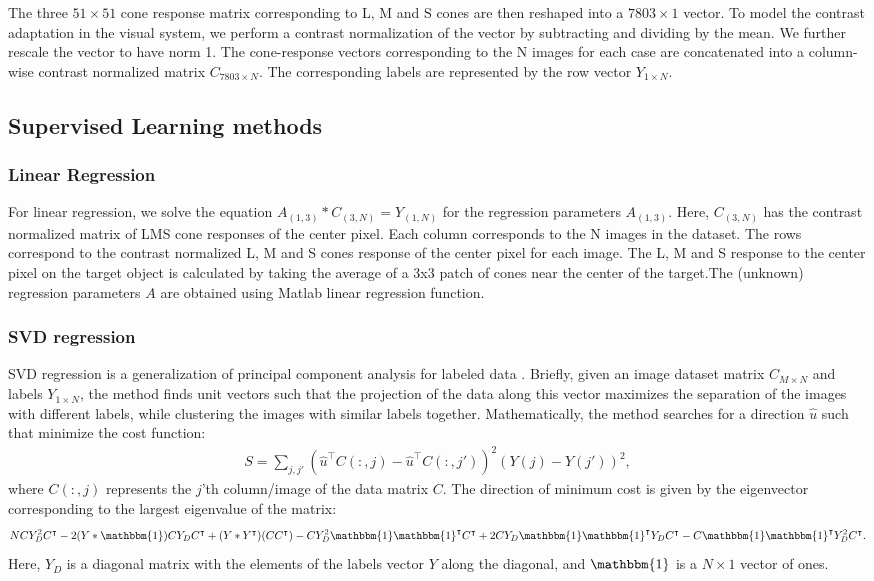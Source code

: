 \documentclass{jov}
\begin{document}
The three $51 \times 51$ cone response matrix corresponding to L, M and S cones are then reshaped into a $7803 \times 1$ vector. To model the contrast adaptation in the visual system, we perform a contrast normalization of the vector by subtracting and dividing by the mean. We further  rescale the vector to have norm 1. The cone-response vectors corresponding to the N images for each case are concatenated into a column-wise contrast normalized matrix $C_{7803\times N}$. The corresponding labels are represented by the row vector $Y_{1\times N}$.

\subsection{Supervised Learning methods} \label{method:SupervisedLearning}
\subsubsection*{Linear Regression} For linear regression, we solve the equation $A_{(1,3)}*C_{(3,N)} = Y_{(1,N)}$ for the regression parameters $A_{(1,3)}$. Here, $C_{(3,N)}$ has the contrast normalized matrix of LMS cone responses of the center pixel. Each column corresponds to the N images in the dataset. The rows correspond to the contrast normalized L, M and S cones response of the center pixel for each image. The L, M and S response to the center pixel on the target object is calculated by taking the average of a 3x3 patch of cones near the center of the target.The (unknown) regression parameters $A$ are obtained using Matlab linear regression function. 

\subsubsection*{SVD regression}
SVD regression is a generalization of principal component analysis for labeled data \cite{ranganNotes}. Briefly, given an image dataset matrix $C_{M \times N}$ and labels $Y_{1\times N}$, the method finds unit vectors such that the projection of the data along this vector maximizes the separation of the images with different labels, while clustering the images with similar labels together. Mathematically, the method searches for a direction $\hat{u}$ such that minimize the cost function:
\begin{align}
S = \sum\limits_{j,j'}\left(\hat{u}^\intercal C(:,j) - \hat{u}^\intercal C(:,j')\right)^2 \left(Y(j)-Y(j') \right)^2,
\end{align} 
where $C(:,j)$ represents the $j$'th column/image of the data matrix $C$. The direction of minimum cost is given by the eigenvector corresponding to the largest eigenvalue of the matrix:
\begin{align}
N C Y_D^2 C^\intercal - 2(Y*\mathbbm{1})C Y_D C^\intercal + (Y*Y^\intercal) (CC^\intercal)-C Y_{D}^2\mathbbm{1}\mathbbm{1}^\intercal C^\intercal +2 C Y_{D} \mathbbm{1}\mathbbm{1}^\intercal Y_{D} C^\intercal - C \mathbbm{1}\mathbbm{1}^\intercal Y_{D}^2 C^\intercal.
\end{align}
Here, $Y_{D}$ is a diagonal matrix with the elements of the labels vector $Y$ along the diagonal, and $\mathbbm{1}$ is a $N\times 1$ vector of ones.
\end{document}
